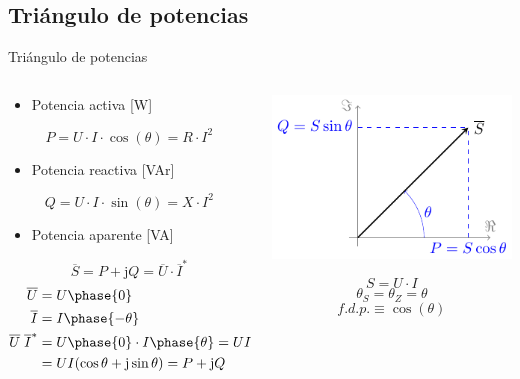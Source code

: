 \documentclass[aspectratio=169, xcolor={usenames,svgnames,dvipsnames}]{beamer}
\begin{document}
\subsection{Triángulo de potencias}

\begin{frame}{Triángulo de potencias}
\begin{columns}
\begin{column}{0.6\columnwidth}
\begin{itemize}
\item Potencia activa [W]
\end{itemize}
\[  
\boxed{P = U\cdot I\cdot\cos(\theta) = R \cdot I^2}
\]

\begin{itemize}
\item Potencia reactiva [VAr]
\end{itemize}
\[
\boxed{Q = U\cdot I\cdot\sin(\theta) = X \cdot I^2}
\]

\begin{itemize}
\item Potencia aparente [VA]
\end{itemize}
\[
\boxed{\overline{S} = P + \mathrm{j}Q = \overline{U} \cdot \overline{I}^*}
\]
{\begin{align*}
  \overline{U} &= U\phase{0}\\
  \overline{I} &= I\phase{-\theta}\\
\overline{U}\;\overline{I}^* &= U\phase{0} \cdot I\phase{\theta} = UI\phase{\theta}=\\
&=U I (\cos\theta + \mathrm{j} \sin\theta) = P + \mathrm{j} Q
\end{align*}}
\end{column}

\begin{column}{0.4\columnwidth}
\vspace{-10mm}
\begin{center}
\includegraphics[width=.8\linewidth]{../figs/trianguloPotencias.pdf}
\end{center}

\[
S = U \cdot I
\]
\[
\theta_S = \theta_Z = \theta
\]
\[
f.d.p. \equiv \cos(\theta)
\]
\end{column}
\end{columns}
\end{frame}
\end{document}
